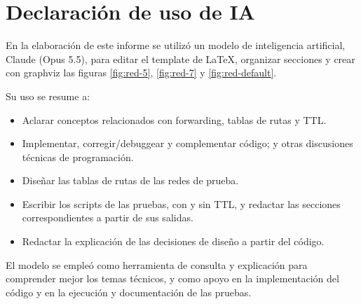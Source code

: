 \documentclass[
	spanish, %
	letterpaper, oneside
]{article}
\begin{document}
\section{Declaración de uso de IA}
En la elaboración de este informe se utilizó un modelo de inteligencia artificial, Claude (Opus 5.5), para editar el template de LaTeX, organizar secciones y crear con graphviz las figuras \ref{fig:red-5}, \ref{fig:red-7} y \ref{fig:red-default}.

Su uso se resume a:
\begin{itemize}
	\item Aclarar conceptos relacionados con forwarding, tablas de rutas y TTL.
	\item Implementar, corregir/debuggear y complementar código; y otras discusiones técnicas de programación.
	\item Diseñar las tablas de rutas de las redes de prueba.
	\item Escribir los scripts de las pruebas, con y sin TTL, y redactar las secciones correspondientes a partir de sus salidas.
	\item Redactar la explicación de las decisiones de diseño a partir del código.
\end{itemize}

El modelo se empleó como herramienta de consulta y explicación para comprender mejor los temas técnicos, y como apoyo en la implementación del código y en la ejecución y documentación de las pruebas.

\end{document}

